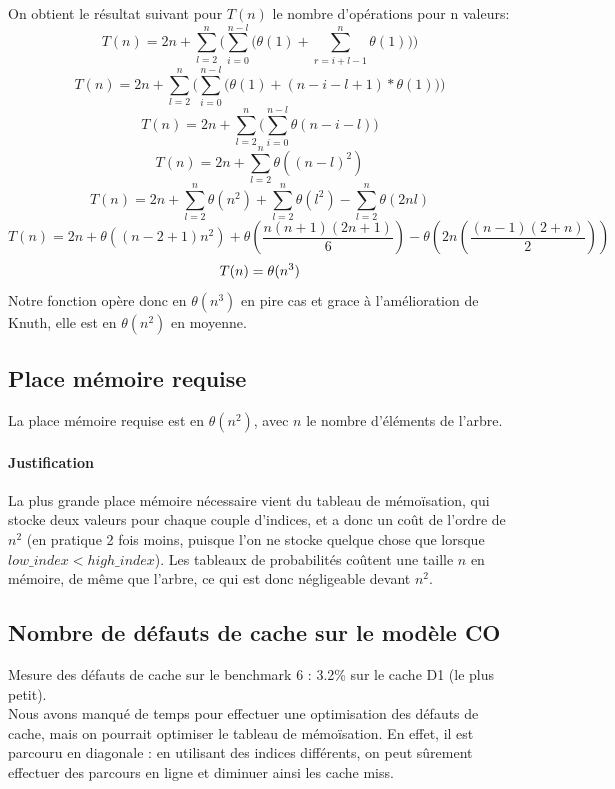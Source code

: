 \documentclass[a4paper, 10pt, french]{article}
\begin{document}
	{On obtient le résultat suivant pour $T(n)$ le nombre d'opérations pour n valeurs:}
	\[ 
		T(n) = 2n + \sum_{l=2}^{n}{\Bigg(\sum_{i=0}^{n-l}{\bigg(\theta(1)+\sum_{r=i+l-1}^{n}{\theta(1)\bigg)\Bigg)}}}
	\]
	\[
		T(n) = 2n + \sum_{l=2}^{n}{\Bigg(\sum_{i=0}^{n-l}{\bigg(\theta(1)+(n-i-l+1)*\theta(1)\bigg)\Bigg)}}
	\]
	\[
		T(n) = 2n + \sum_{l=2}^{n}{\Bigg(\sum_{i=0}^{n-l}{\theta(n-i-l)\Bigg)}}
	\]
	\[
		T(n) = 2n + \sum_{l=2}^{n}{\theta((n-l)^{2})}
	\]
	\[
		T(n) = 2n + \sum_{l=2}^{n}{\theta(n^2)} + \sum_{l=2}^{n}{\theta(l^2)} -\sum_{l=2}^{n}{\theta(2nl)}
	\]
	\[
		T(n) = 2n + \theta((n-2+1)n^2) + \theta(\frac{n(n+1)(2n+1)}{6}) -\theta(2n(\frac{(n-1)(2+n)}{2}))
	\]
	\[
		T(n) = \theta(n^3)\\
	\]
	{Notre fonction opère donc en $\theta(n^3)$ en pire cas et grace à l'amélioration de Knuth, elle est en $\theta(n^2)$ en moyenne.}\\

  \subsection{Place mémoire requise}
  La place mémoire requise est en $\theta(n^2)$, avec $n$ le nombre d'éléments de l'arbre.
	\paragraph{Justification}
	La plus grande place mémoire nécessaire vient du tableau de mémoïsation, qui stocke deux valeurs pour chaque couple d'indices, et a donc un coût de l'ordre de $n^2$ (en pratique 2 fois moins, puisque l'on ne stocke quelque chose que lorsque $low\_index < high\_index$).
	Les tableaux de probabilités coûtent une taille $n$ en mémoire, de même que l'arbre, ce qui est donc négligeable devant $n^2$.

  \subsection{Nombre de défauts de cache sur le modèle CO}
	Mesure des défauts de cache sur le benchmark 6 : 3.2\% sur le cache D1 (le plus petit). \\

	Nous avons manqué de temps pour effectuer une optimisation des défauts de cache, mais on pourrait optimiser le tableau de mémoïsation. 
	En effet, il est parcouru en diagonale : en utilisant des indices différents, on peut sûrement effectuer des parcours en ligne et diminuer ainsi les cache miss.
\end{document}
